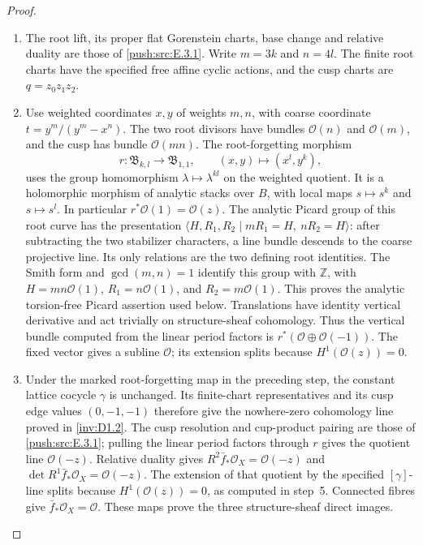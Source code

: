 \begin{proof}
\begin{enumerate}[label=\arabic*.,leftmargin=*]
\item The root lift, its proper flat Gorenstein charts, base change and
relative duality are those of \cref{push:src:E.3.1}.
Write $m=3k$ and $n=4l$. The finite root charts have the specified
free affine cyclic actions, and the cusp charts are $q=z_0z_1z_2$.

\item Use weighted coordinates $x,y$ of weights $m,n$, with coarse
coordinate $t=y^m/(y^m-x^n)$.
The two root divisors have bundles $\mathcal O(n)$ and
$\mathcal O(m)$, and the cusp has bundle $\mathcal O(mn)$.
The root-forgetting morphism
\[
 r:\mathfrak B_{k,l}\longrightarrow\mathfrak B_{1,1},
 \qquad (x,y)\longmapsto(x^l,y^k),
\]
uses the group homomorphism $\lambda\mapsto\lambda^{kl}$ on
the weighted quotient.  It is a holomorphic morphism of analytic
stacks over $B$, with local maps $s\mapsto s^k$ and
$s\mapsto s^l$.  In particular $r^*\mathcal O(1)=\mathcal O(z)$.
The analytic Picard group of this root curve has
the presentation
$\langle H,R_1,R_2\mid mR_1=H,\ nR_2=H\rangle$:
after subtracting the two stabilizer characters, a line bundle
descends to the coarse projective line.  Its only relations are
the two defining root identities.  The Smith form and
$\gcd(m,n)=1$ identify this group with $\mathbb Z$, with
$H=mn\mathcal O(1)$, $R_1=n\mathcal O(1)$, and
$R_2=m\mathcal O(1)$.  This proves the analytic torsion-free
Picard assertion used below.
Translations have identity vertical derivative and act trivially
on structure-sheaf cohomology.  Thus the vertical bundle computed
from the linear period factors is $r^*(\mathcal O\oplus
\mathcal O(-1))$.  The fixed vector gives a subline $\mathcal O$; its extension
splits because $H^1(\mathcal O(z))=0$.

\item Under the marked root-forgetting map in the preceding step,
the constant lattice cocycle $\gamma$ is unchanged. Its finite-chart
representatives and its cusp edge values $(0,-1,-1)$ therefore
give the nowhere-zero cohomology line proved in \cref{inv:D1.2}.
The cusp resolution and cup-product pairing are those of
\cref{push:src:E.3.1}; pulling the linear period factors through $r$
gives the quotient line $\mathcal O(-z)$.
Relative duality gives
$R^2\bar f_*\mathcal O_X=\mathcal O(-z)$ and
$\det R^1\bar f_*\mathcal O_X=\mathcal O(-z)$.
The extension of that quotient by the specified $[\gamma]$-line
splits because $H^1(\mathcal O(z))=0$, as computed in step~5.
Connected fibres give $\bar f_*\mathcal O_X=\mathcal O$.
These maps prove the three structure-sheaf direct images.


\end{enumerate}
\end{proof}
